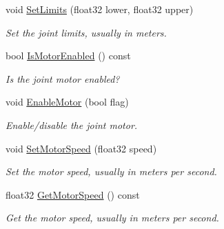 \begin{DoxyCompactItemize}
\mbox{\label{classb2_prismatic_joint_a82a220e6d5a212c1924882e0855b0bef}} 
void \hyperlink{classb2_prismatic_joint_a82a220e6d5a212c1924882e0855b0bef}{Set\+Limits} (float32 lower, float32 upper)
\begin{DoxyCompactList}\small\item\em Set the joint limits, usually in meters. \end{DoxyCompactList}\item 
\mbox{\label{classb2_prismatic_joint_a06492dabf33439efdebceb29899c7fc9}} 
bool \hyperlink{classb2_prismatic_joint_a06492dabf33439efdebceb29899c7fc9}{Is\+Motor\+Enabled} () const
\begin{DoxyCompactList}\small\item\em Is the joint motor enabled? \end{DoxyCompactList}\item 
\mbox{\label{classb2_prismatic_joint_a4a7fd079de49f7ed5aa4a5d8d90be2a2}} 
void \hyperlink{classb2_prismatic_joint_a4a7fd079de49f7ed5aa4a5d8d90be2a2}{Enable\+Motor} (bool flag)
\begin{DoxyCompactList}\small\item\em Enable/disable the joint motor. \end{DoxyCompactList}\item 
\mbox{\label{classb2_prismatic_joint_a602ef7a6ca4fca55d011f1b38ab5a6c3}} 
void \hyperlink{classb2_prismatic_joint_a602ef7a6ca4fca55d011f1b38ab5a6c3}{Set\+Motor\+Speed} (float32 speed)
\begin{DoxyCompactList}\small\item\em Set the motor speed, usually in meters per second. \end{DoxyCompactList}\item 
\mbox{\label{classb2_prismatic_joint_a869c6edeb62ed01237b2adb09da273ae}} 
float32 \hyperlink{classb2_prismatic_joint_a869c6edeb62ed01237b2adb09da273ae}{Get\+Motor\+Speed} () const
\begin{DoxyCompactList}\small\item\em Get the motor speed, usually in meters per second. \end{DoxyCompactList}\item 
\mbox{\label{classb2_prismatic_joint_aa7817474aef15ca4815341479ac590e2}} 

\end{DoxyCompactItemize}
